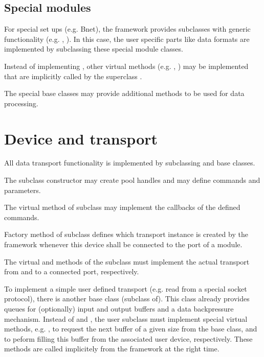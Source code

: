 \subsection{Special modules}
For special set ups (e.g. Bnet), the framework provides 
    subclasses with generic functionality 
   (e.g. , ). 
   In this case, the user specific parts like data formats are 
   implemented by subclassing these special module classes.
\begin{compactitem}[$\circ$]
\item  Instead of implementing , other virtual 
      methods (e.g. , ) may be 
      implemented that are implicitly called by the superclass .
\item  The special base classes may provide additional 
      methods to be used for data processing.    
\end{compactitem}

\section{Device and transport}
All data transport functionality is implemented by 
   subclassing   and  base classes. 
\begin{compactitem}[$\circ$]
\item  The  subclass constructor may create  
      pool handles and may define commands and parameters. 
\item  The virtual  method of  
      subclass may implement the callbacks of the defined commands.
\item  Factory method  of 
      subclass defines which transport instance is created 
      by the framework whenever this device shall be connected to 
      the port of a module.   
\item  The virtual  and  methods of the 
       subclass must implement the actual transport 
      from and to a connected port, respectively.
\item  To implement a simple user defined transport 
      (e.g. read from a special socket protocol), 
      there is another base class  
      (subclass of). 
      This class already provides queues for (optionally)
      input and output buffers and a data backpressure mechanism. 
      Instead of  and , the user subclass must implement 
      special virtual methods, e.g. ,  
      to request the next buffer of a given size from the base class, 
      and to peform filling this buffer from the associated user device, respectively. 
      These methods are called implicitely from the framework at the right time. 
\end{compactitem}

